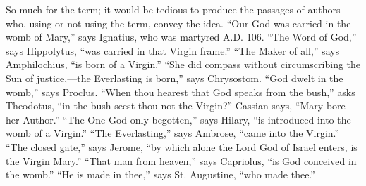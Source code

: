 So much for the term; it would be tedious to produce the passages of
authors who, using or not using the term, convey the idea. ``Our God
was carried in the womb of Mary,'' says Ignatius, who was martyred A.D. 106. ``The Word of God,'' says Hippolytus, ``was
carried in that Virgin frame.'' ``The Maker of all,'' says
Amphilochius, ``is born of a Virgin.'' ``She did compass
without circumscribing the Sun of justice,—the Everlasting is
born,'' says Chrysostom. ``God dwelt in the womb,'' says
Proclus. ``When thou hearest that God speaks from the bush,''
asks Theodotus, ``in the bush seest thou not the Virgin?''
Cassian says, ``Mary bore her Author.'' ``The One God
only-begotten,'' says Hilary, ``is introduced into the womb of a
Virgin.'' ``The Everlasting,'' says Ambrose, ``came into the
Virgin.'' ``The closed gate,'' says Jerome, ``by which
alone the Lord God of Israel enters, is the Virgin Mary.''
``That man from heaven,'' says Capriolus, ``is God conceived
in the womb.'' ``He is made in thee,'' says St. Augustine,
``who made thee.''


